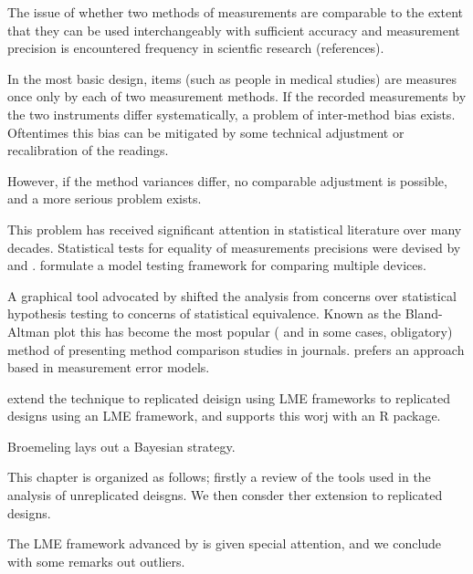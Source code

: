 

The issue of whether two methods of measurements are 
comparable to the extent that they can be used 
interchangeably with sufficient accuracy and measurement precision is encountered frequency in scientfic research (references).


In the most basic design, items (such as people in medical studies) are measures once only by each of two measurement methods. 
If the recorded measurements by the two instruments differ systematically, a problem of inter-method bias exists. Oftentimes this bias can be mitigated by some technical adjustment or recalibration of the readings.

However, if the method variances differ, no comparable adjustment is possible, and a more serious problem exists.


This problem has received significant attention in statistical literature over many decades.
Statistical tests for equality of measurements precisions were devised by \citet{Pitman} and \citet{Morgan}. \citet{Grubbs48,Grubbs73} formulate a model testing framework for comparing multiple devices.




A graphical tool advocated by \citet{BA83,BA86} shifted the analysis from concerns over statistical hypothesis testing to concerns of statistical equivalence. Known as the Bland-Altman plot this has become the most popular ( and in some cases, obligatory) method of presenting method comparison studies in journals.
\citet{DunnSEME} prefers an approach based in measurement error models.



\citet{BXC2008} extend the technique to replicated deisign using LME frameworks to replicated designs using an LME framework, and supports this worj with an R package.

Broemeling lays out a Bayesian strategy.



This chapter is organized as follows; firstly a review of the tools used in the analysis of unreplicated deisgns. We then consder ther extension to replicated designs.

The LME framework advanced by \citet{BXC2008} is given special attention, and we conclude with some remarks out outliers.


